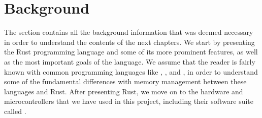 
\chapter{Background}
\label{chap:background}

The section contains all the background information that was deemed necessary in order to understand the contents of the next chapters.
We start by presenting the Rust programming language and some of its more prominent features, as well as the most important goals of the language.
We assume that the reader is fairly known with common programming languages like \Java, \C, and \Cpp, in order to understand some of the fundamental differences with memory management between these languages and Rust.
After presenting Rust, we move on to the hardware and microcontrollers that we have used in this project, including their software suite called \emlib.








% 
% 
% 
